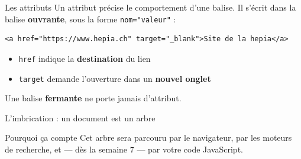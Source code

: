 \documentclass[aspectratio=169,11pt]{beamer}
\begin{document}
\begin{frame}[fragile]{Les attributs}
  Un attribut précise le comportement d'une balise. Il s'écrit dans la balise \textbf{ouvrante}, sous la forme \texttt{nom="valeur"} :
  \vspace{0.3cm}
\begin{lstlisting}[language=HTML5]
<a href="https://www.hepia.ch" target="_blank">Site de la hepia</a>
\end{lstlisting}
  \vspace{0.3cm}
  \begin{itemize}
    \item \texttt{href} indique la \textbf{destination} du lien
    \item \texttt{target} demande l'ouverture dans un \textbf{nouvel onglet}
  \end{itemize}
  \vspace{0.3cm}
  \begin{center}
    \small Une balise \textbf{fermante} ne porte jamais d'attribut.
  \end{center}
\end{frame}

\begin{frame}{L'imbrication : un document est un arbre}
  \vspace{0.15cm}
  \begin{center}
  \end{center}
  \vspace{0.15cm}
  \begin{block}{Pourquoi ça compte}
    Cet arbre sera parcouru par le navigateur, par les moteurs de recherche, et --- dès la semaine 7 --- par votre code JavaScript.
  \end{block}
\end{frame}
\end{document}
